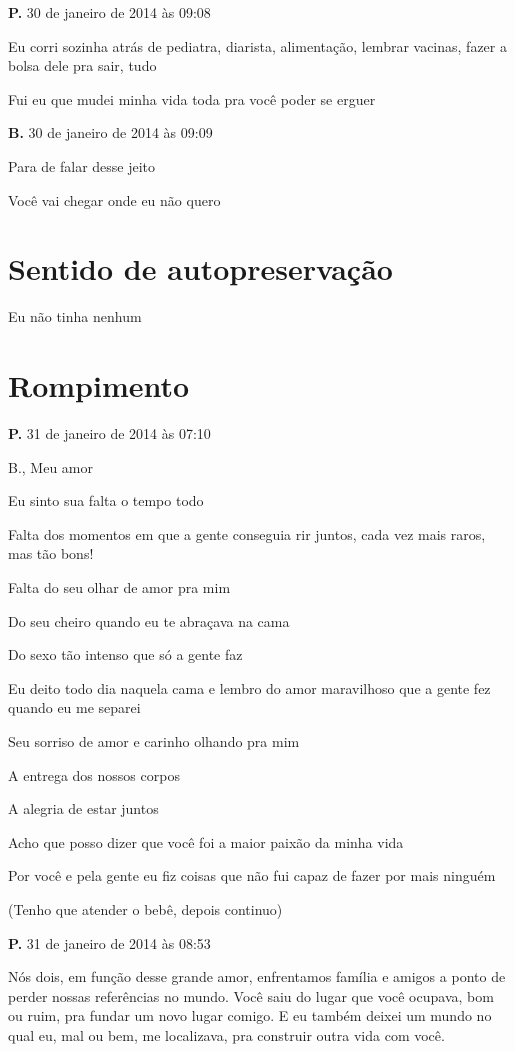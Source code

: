 {{\textbf{P.} 30 de janeiro de 2014 às 09:08

Eu corri sozinha atrás de pediatra, diarista, alimentação, lembrar
vacinas, fazer a bolsa dele pra sair, tudo

Fui eu que mudei minha vida toda pra você poder se erguer

\textbf{B.} 30 de janeiro de 2014 às 09:09

Para de falar desse jeito

Você vai chegar onde eu não quero

\chapter{Sentido de
autopreservação}\label{sentido-de-autopreservauxe7uxe3o}

Eu não tinha nenhum

\chapter{Rompimento}

{\parindent0pt\parskip1pt\raggedright

\textbf{P.} 31 de janeiro de 2014 às 07:10

B., Meu amor

Eu sinto sua falta o tempo todo

Falta dos momentos em que a gente conseguia rir juntos, cada vez mais
raros, mas tão bons!

Falta do seu olhar de amor pra mim

Do seu cheiro quando eu te abraçava na cama

Do sexo tão intenso que só a gente faz

Eu deito todo dia naquela cama e lembro do amor maravilhoso que a gente
fez quando eu me separei

Seu sorriso de amor e carinho olhando pra mim

A entrega dos nossos corpos

A alegria de estar juntos

Acho que posso dizer que você foi a maior paixão da minha vida

Por você e pela gente eu fiz coisas que não fui capaz de fazer por mais
ninguém

(Tenho que atender o bebê, depois continuo)

\textbf{P.} 31 de janeiro de 2014 às 08:53

Nós dois, em função desse grande amor, enfrentamos família e amigos a
ponto de perder nossas referências no mundo. Você saiu do lugar que você
ocupava, bom ou ruim, pra fundar um novo lugar comigo. E eu também
deixei um mundo no qual eu, mal ou bem, me localizava, pra construir
outra vida com você.

}}}
